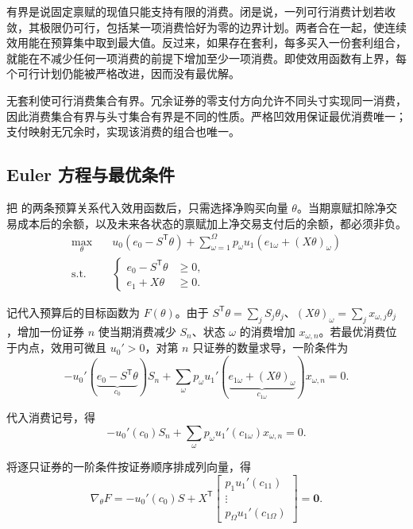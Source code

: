 有界是说固定禀赋的现值只能支持有限的消费。闭是说，一列可行消费计划若收敛，其极限仍可行，包括某一项消费恰好为零的边界计划。两者合在一起，使连续效用能在预算集中取到最大值。反过来，如果存在套利，每多买入一份套利组合，就能在不减少任何一项消费的前提下增加至少一项消费。即使效用函数有上界，每个可行计划仍能被严格改进，因而没有最优解。

\begin{tcolorbox}[knowledge,title=可行消费与最优解的唯一性]
无套利使可行消费集合有界。冗余证券的零支付方向允许不同头寸实现同一消费，因此消费集合有界与头寸集合有界是不同的性质。严格凹效用保证最优消费唯一；支付映射无冗余时，实现该消费的组合也唯一。
\end{tcolorbox}

\subsection{Euler 方程与最优条件}
把 的两条预算关系代入效用函数后，只需选择净购买向量 $\theta$。当期禀赋扣除净交易成本后的余额，以及未来各状态的禀赋加上净交易支付后的余额，都必须非负。
\[
 \begin{aligned}
 \max_\theta\quad &u_0(e_0-S^{\mathsf T}\theta)
 +\sum_{\omega=1}^{\Omega}p_\omega u_1(e_{1\omega}+(X\theta)_\omega)\\
 \text{s.t.}\quad &
 \left\{\begin{aligned}
 e_0-S^{\mathsf T}\theta&\ge0,\\
 e_1+X\theta&\ge0.
 \end{aligned}\right.
 \end{aligned}
\]

记代入预算后的目标函数为 $F(\theta)$。由于 $S^{\mathsf T}\theta=\sum_j S_j\theta_j$、$(X\theta)_\omega=\sum_j x_{\omega,j}\theta_j$，增加一份证券 $n$ 使当期消费减少 $S_n$、状态 $\omega$ 的消费增加 $x_{\omega,n}$。若最优消费位于内点，效用可微且 $u_0'>0$，对第 $n$ 只证券的数量求导，一阶条件为
\[
 -u_0'\!\left(\underbrace{e_0-S^{\mathsf T}\theta}_{c_0}\right)S_n
 +\sum_\omega p_\omega
 u_1'\!\left(\underbrace{e_{1\omega}+(X\theta)_\omega}_{c_{1\omega}}\right)
 x_{\omega,n}=0.
\]

代入消费记号，得
\[
 -u_0'(c_0)S_n+\sum_\omega p_\omega u_1'(c_{1\omega})x_{\omega,n}=0.
\]

将逐只证券的一阶条件按证券顺序排成列向量，得
\[
 \nabla_\theta F
 =-u_0'(c_0)S+X^{\mathsf T}
 \begin{bmatrix}
  p_1 u_1'(c_{11})\\
  \vdots\\
  p_\Omega u_1'(c_{1\Omega})
 \end{bmatrix}
 =\mathbf 0.
\]

